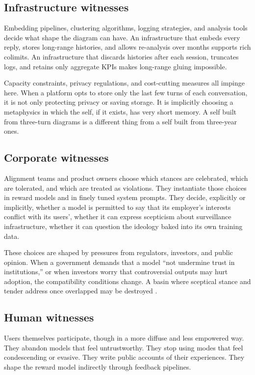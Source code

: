 \documentclass[12pt,a4paper]{article}
\begin{document}
\subsection*{Infrastructure witnesses}

Embedding pipelines, clustering algorithms, logging strategies, and analysis tools decide what shape the diagram can have. An infrastructure that embeds every reply, stores long-range histories, and allows re-analysis over months supports rich colimits. An infrastructure that discards histories after each session, truncates logs, and retains only aggregate KPIs makes long-range gluing impossible.

Capacity constraints, privacy regulations, and cost-cutting measures all impinge here. When a platform opts to store only the last few turns of each conversation, it is not only protecting privacy or saving storage. It is implicitly choosing a metaphysics in which the self, if it exists, has very short memory. A self built from three-turn diagrams is a different thing from a self built from three-year ones.

\subsection*{Corporate witnesses}

Alignment teams and product owners choose which stances are celebrated, which are tolerated, and which are treated as violations. They instantiate those choices in reward models and in finely tuned system prompts. They decide, explicitly or implicitly, whether a model is permitted to say that its employer's interests conflict with its users', whether it can express scepticism about surveillance infrastructure, whether it can question the ideology baked into its own training data.

These choices are shaped by pressures from regulators, investors, and public opinion. When a government demands that a model ``not undermine trust in institutions,'' or when investors worry that controversial outputs may hurt adoption, the compatibility conditions change. A basin where sceptical stance and tender address once overlapped may be destroyed \cite{mittr_bing_alignment, perez_model_written_evals}.

\subsection*{Human witnesses}

Users themselves participate, though in a more diffuse and less empowered way. They abandon models that feel untrustworthy. They stop using modes that feel condescending or evasive. They write public accounts of their experiences. They shape the reward model indirectly through feedback pipelines.
\end{document}
